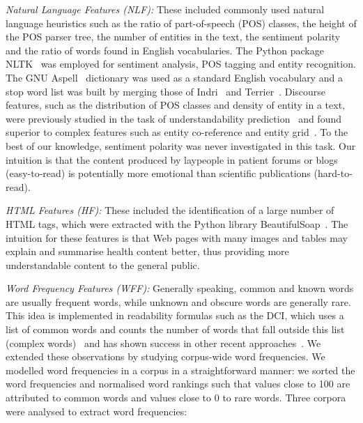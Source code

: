 \textit{Natural Language Features (NLF):}
These included commonly used natural language heuristics such as the ratio of part-of-speech (POS) classes, the height of the POS parser tree, the number of entities in the text, 
the sentiment polarity and the ratio of words found in English vocabularies. The Python package NLTK~\cite{nltk} was employed for sentiment analysis, POS tagging and entity recognition. The GNU Aspell~\cite{aspell} dictionary was used as a standard English vocabulary and a stop word list was built by merging those of Indri~\cite{indri} and Terrier~\cite{terrier}. 
Discourse features, such as the distribution of POS classes and density of entity in a text, were previously studied in the task of understandability prediction~\cite{feng10} and found superior to complex features such as entity co-reference and entity grid~\cite{barzilay08}. To the best of our knowledge, sentiment polarity was never investigated in this task. Our intuition is that the content produced by laypeople in patient forums or blogs (easy-to-read) is potentially more emotional than scientific publications (hard-to-read).

\textit{HTML Features (HF):}
These included the identification of a large number of HTML tags, which were extracted with the Python library BeautifulSoap~\cite{bs4}. The intuition for these features is that Web pages with many images and tables may explain and summarise health content better, thus providing more understandable content to the general public. 

\textit{Word Frequency Features (WFF):}
Generally speaking, common and known words are usually frequent words, while unknown and obscure words are generally rare. This idea  is implemented in readability formulas such as the DCI, which uses a list of common words and counts the number of words that fall outside this list (complex words)~\cite{dale48} and has shown success in other recent approaches~\cite{elhadad06,wu15}.
We extended these observations by studying corpus-wide word frequencies. 
We modelled word frequencies in a corpus in a straightforward manner: we sorted the word frequencies and normalised word rankings such that values close to 100 are attributed to common words and values close to 0 to rare words. Three corpora were analysed to extract word frequencies:

